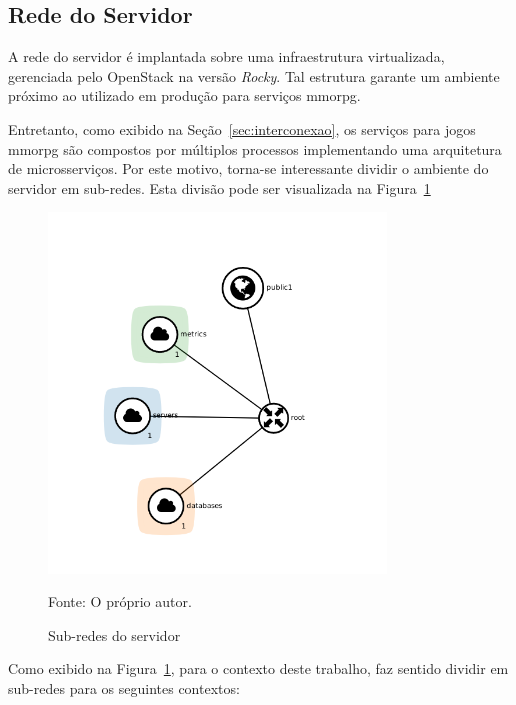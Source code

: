\subsection{Rede do Servidor}
\label{sec:net_server}



A rede do servidor é implantada sobre uma infraestrutura virtualizada, gerenciada pelo OpenStack na versão \textit{Rocky}.
%
Tal estrutura garante um ambiente próximo ao utilizado em produção para serviços \ac{mmorpg}.


Entretanto, como exibido na Seção~\ref{sec:interconexao}, os serviços para jogos \ac{mmorpg} são compostos por múltiplos processos implementando uma arquitetura de microsserviços.
%
Por este motivo, torna-se interessante dividir o ambiente do servidor em sub-redes.
%
Esta divisão pode ser visualizada na Figura~\ref{fig:network_server}



\begin{figure}[htb!]
  \caption{Sub-redes do servidor}
  \label{fig:network_server}
  \includegraphics[width=0.8\textwidth]{figuras/network/circles_only_networks.png}
  \centering

  Fonte: O próprio autor.
\end{figure}



Como exibido na Figura~\ref{fig:network_server}, para o contexto deste trabalho, faz sentido dividir em sub-redes para os seguintes contextos:




